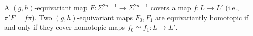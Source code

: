 A $(g, h)$-equivariant map $F: \Sigma^{2n-1} \to \Sigma^{2n-1}$ covers a map $f: L \to L'$ (i.e., $\pi' F = f \pi$). Two $(g, h)$-equivariant maps $F_0, F_1$ are equivariantly homotopic if and only if they cover homotopic maps $f_0 \simeq f_1: L \to L'$.
